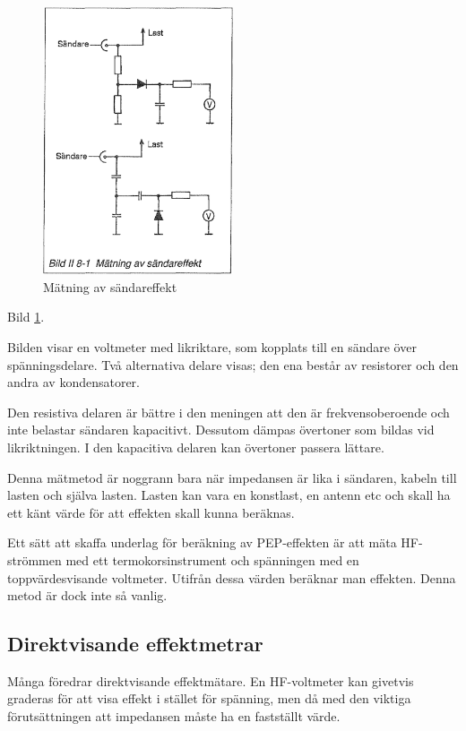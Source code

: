 \begin{figure}
  \includegraphics[width=0.5\textwidth]{images/bild_2_8-01}
  \caption{Mätning av sändareffekt}
  \label{fig:bildII8-1}
\end{figure}

Bild \ref{fig:bildII8-1}.

Bilden visar en voltmeter med likriktare, som kopplats till en sändare
över spänningsdelare. Två alternativa delare visas; den ena består av
resistorer och den andra av kondensatorer.

Den resistiva delaren är bättre i den meningen att den är
frekvensoberoende och inte belastar sändaren kapacitivt. Dessutom
dämpas övertoner som bildas vid likriktningen. I den kapacitiva
delaren kan övertoner passera lättare.

Denna mätmetod är noggrann bara när impedansen är lika i sändaren,
kabeln till lasten och själva lasten. Lasten kan vara en konstlast, en
antenn etc och skall ha ett känt värde för att effekten skall kunna
beräknas.

Ett sätt att skaffa underlag för beräkning av PEP-effekten är att mäta
HF-strömmen med ett termokorsinstrument och spänningen med en
toppvärdesvisande voltmeter.  Utifrån dessa värden beräknar man
effekten. Denna metod är dock inte så vanlig.

\subsection{Direktvisande effektmetrar}

Många föredrar direktvisande effektmätare.  En HF-voltmeter kan
givetvis graderas för att visa effekt i stället för spänning, men då
med den viktiga förutsättningen att impedansen måste ha en fastställt
värde.

